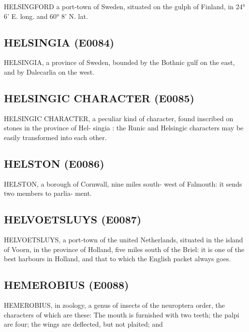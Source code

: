 \documentclass{article}
\begin{document}
HELSINGFORD a port-town of Sweden, situated on
the gulph of Finland, in 24° 6' E. long. and 60° 8'
N. lat.

\subsection*{HELSINGIA (E0084)}
HELSINGIA, a province of Sweden, bounded by the Bothnic gulf on the east, and by Dalecarlia on the west.

\subsection*{HELSINGIC CHARACTER (E0085)}
HELSINGIC CHARACTER, a peculiar kind of character, found inscribed on stones in the province of Hel- singia : the Runic and Helsingic characters may be easily transformed into each other.

\subsection*{HELSTON (E0086)}
HELSTON, a borough of Cornwall, nine miles south-
west of Falmouth: it sends two members to parlia-
ment.

\subsection*{HELVOETSLUYS (E0087)}
HELVOETSLUYS, a port-town of the united Netherlands, situated in the island of Voorn, in the province of Holland, five miles south of the Briel: it is one of the best harbours in Holland, and that to which the English packet always goes.

\subsection*{HEMEROBIUS (E0088)}
HEMEROBIUS, in zoology, a genus of insects of the neuroptera order, the characters of which are these: The mouth is furnished with two teeth; the palpi are four; the wings are deflected, but not plaited; and
\end{document}

